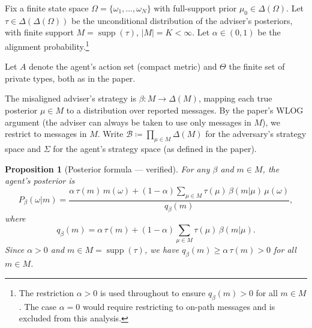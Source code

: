 \documentclass[12pt]{article}
\newtheorem{proposition}[theorem]{Proposition}
\newcommand{\supp}{\operatorname{supp}}
\begin{document}
Fix a finite state space $\Omega = \{\omega_1, \ldots, \omega_N\}$ with full-support prior $\mu_0 \in \Delta(\Omega)$. Let $\tau \in \Delta(\Delta(\Omega))$ be the unconditional distribution of the adviser's posteriors, with finite support $M = \supp(\tau)$, $|M| = K < \infty$. Let $\alpha \in (0,1)$ be the alignment probability.\footnote{The restriction $\alpha > 0$ is used throughout to ensure $q_\beta(m) > 0$ for all $m \in M$. The case $\alpha = 0$ would require restricting to on-path messages and is excluded from this analysis.}

Let $A$ denote the agent's action set (compact metric) and $\Theta$ the finite set of private types, both as in the paper.

The misaligned adviser's strategy is $\beta : M \to \Delta(M)$, mapping each true posterior $\mu \in M$ to a distribution over reported messages. By the paper's WLOG argument (the adviser can always be taken to use only messages in $M$), we restrict to messages in $M$. Write $\mathcal{B} \coloneqq \prod_{\mu \in M} \Delta(M)$ for the adversary's strategy space and $\Sigma$ for the agent's strategy space (as defined in the paper).

\begin{proposition}[Posterior formula --- verified]
\label{prop:posterior}
For any $\beta$ and $m \in M$, the agent's posterior is
\begin{equation}
\label{eq:posterior}
P_\beta(\omega | m) = \frac{\alpha\, \tau(m)\, m(\omega) + (1-\alpha) \sum_{\mu \in M} \tau(\mu)\, \beta(m|\mu)\, \mu(\omega)}{q_\beta(m)},
\end{equation}
where
\begin{equation}
\label{eq:qbeta}
q_\beta(m) = \alpha\, \tau(m) + (1-\alpha) \sum_{\mu \in M} \tau(\mu)\, \beta(m|\mu).
\end{equation}
Since $\alpha > 0$ and $m \in M = \supp(\tau)$, we have $q_\beta(m) \geq \alpha\,\tau(m) > 0$ for all $m \in M$.
\end{proposition}
\end{document}
